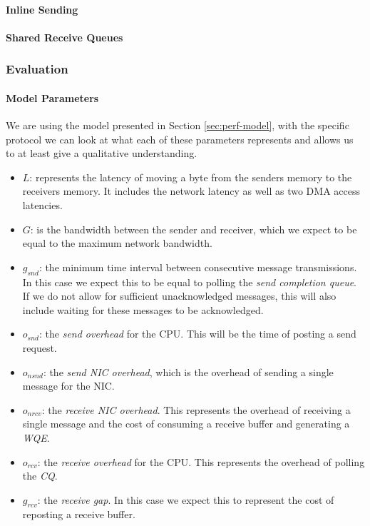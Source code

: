\paragraph{Inline Sending}
\paragraph{Shared Receive Queues}

\subsubsection{Evaluation}

\paragraph{Model Parameters} We are using the model presented in Section \ref{sec:perf-model}, with the specific protocol 
we can look at what each of these parameters represents and allows us to at least give a qualitative understanding.


\begin{itemize}
  \item $L$: represents the latency of moving a byte from the senders memory to the receivers memory. It includes the 
    network latency as well as two DMA access latencies.
  \item $G$: is the bandwidth between the sender and receiver, which we expect to be equal to the maximum network bandwidth.
  \item $g_{snd}$: the minimum time interval between consecutive message transmissions. In this case we expect this to be 
    equal to polling the \emph{send completion queue}. If we do not allow for sufficient unacknowledged messages, this will
    also include waiting for these messages to be acknowledged.
  \item $o_{snd}$: the \emph{send overhead} for the CPU. This will be the time of posting a send request.
  \item $o_{nsnd}$: the \emph{send NIC overhead}, which is the overhead of sending a single message for the NIC.
  \item $o_{nrcv}$: the \emph{receive NIC overhead}. This represents the overhead of receiving a single message and the cost of 
    consuming a receive buffer and generating a \emph{WQE}.
  \item $o_{rcv}$: the \emph{receive overhead} for the CPU. This represents the overhead of polling the \emph{CQ}.
  \item $g_{rcv}$: the \emph{receive gap}. In this case we expect this to represent the cost of reposting a receive buffer.
\end{itemize}


